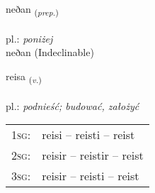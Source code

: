 \documentclass[frontgrid, backgrid]{flacards}\usepackage[]{graphicx}\usepackage[]{xcolor}
\begin{document}

\renewcommand{\flhead}{\vskip5pt \fboxsep=0pt {\small\bfseries\footnotesize Forsetning | Preposition}}
\renewcommand{\fcfoot}{\vskip5pt \fboxsep=0pt \hspace{2pt}{\small\bfseries\footnotesize 2K}}

\renewcommand{\blhead}{\vskip5pt {\small\bfseries\footnotesize Forsetning | Preposition }}
\renewcommand{\bcfoot}{\vskip5pt \hspace{2pt}{\small\bfseries\footnotesize 2K}}


{neðan \small{\textsubscript{(\textit{prep.})}} \\[1ex]
\textphonetic{[nɛːðan]} \\
pl.: \emph{poniżej} \\  [2ex]
neðan (Indeclinable)}

\renewcommand{\flhead}{\vskip5pt \fboxsep=0pt {\small\bfseries\footnotesize Sagnorð | Verb}}
\renewcommand{\fcfoot}{\vskip5pt \fboxsep=0pt \hspace{2pt}{\small\bfseries\footnotesize 2K}}

\renewcommand{\blhead}{\vskip5pt {\small\bfseries\footnotesize Sagnorð | Verb }}
\renewcommand{\bcfoot}{\vskip5pt \hspace{2pt}{\small\bfseries\footnotesize 2K}}


{reisa \small{\textsubscript{(\textit{v.})}} \\[1ex] %
\textphonetic{[reiːsa]} \\
pl.: \emph{podnieść; budować, założyć} \\  [2ex]
\renewcommand*{\arraystretch}{0.8}
\begin{tabular}{p{1cm}l}
\textsc{1sg}: & reisi -- reisti -- reist \\ 
\textsc{2sg}: & reisir -- reistir -- reist \\ 
\textsc{3sg}: & reisir -- reisti -- reist \\ 
\end{tabular}
}

\renewcommand{\flhead}{\vskip5pt \fboxsep=0pt {\small\bfseries\footnotesize Nafnorð | Noun}}
\renewcommand{\fcfoot}{\vskip5pt \fboxsep=0pt \hspace{2pt}{\small\bfseries\footnotesize 2K}}
\end{document}
